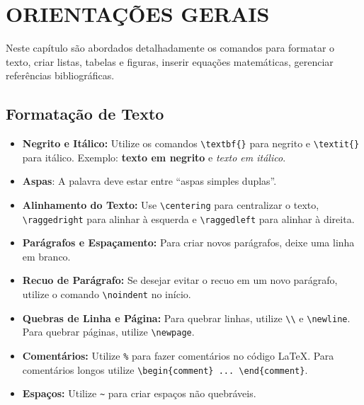 \chapter{ORIENTAÇÕES GERAIS}
\label{chap:orientacoesGerais}

Neste capítulo são abordados detalhadamente os comandos para formatar o texto, criar listas, tabelas e figuras, inserir equações matemáticas, gerenciar referências bibliográficas.

\section{Formatação de Texto}
\label{sec:formatacaoTexto}

\begin{itemize}
\item \textbf{Negrito e Itálico:} Utilize os comandos \verb|\textbf{}| para negrito e \verb|\textit{}| para itálico. Exemplo: \textbf{texto em negrito} e \textit{texto em itálico}.

\item \textbf{Aspas}: A palavra deve estar entre ``aspas simples duplas''.

\item \textbf{Alinhamento do Texto:} Use \verb|\centering| para centralizar o texto, \verb|\raggedright| para alinhar à esquerda e \verb|\raggedleft| para alinhar à direita.

\item \textbf{Parágrafos e Espaçamento:} Para criar novos parágrafos, deixe uma linha em branco.

\item \textbf{Recuo de Parágrafo:} Se desejar evitar o recuo em um novo parágrafo, utilize o comando \verb|\noindent| no início.

\item \textbf{Quebras de Linha e Página:} Para quebrar linhas, utilize \verb|\\| e \verb|\newline|. Para quebrar páginas, utilize \verb|\newpage|.

\item \textbf{Comentários:} Utilize \verb|%| para fazer comentários no código LaTeX. Para comentários longos utilize  \verb|\begin{comment} ... \end{comment}|.

\item \textbf{Espaços:} Utilize \verb|~| para criar espaços não quebráveis.

\end{itemize}


